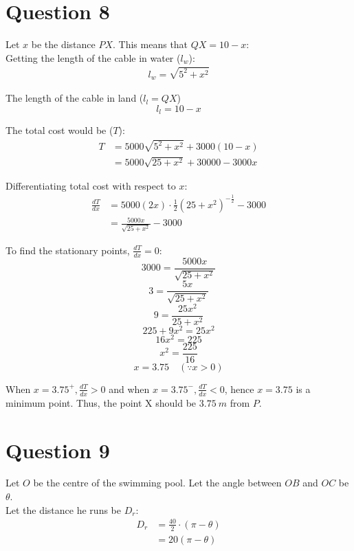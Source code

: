 \documentclass[11pt]{article}
\begin{document}
\section{Question 8}
\label{sec:org3f82fc3}

Let \(x\) be the distance \(PX\). This means that \(QX = 10 - x\):
\\[0pt]

Getting the length of the cable in water (\(l_w\)):
\begin{align*}
l_w = \sqrt{5^2 + x^2}
\end{align*}

The length of the cable in land (\(l_l = QX\))
\[l_l = 10 - x\]

The total cost would be (\(T\)):
\begin{align*}
T &= 5000\sqrt{5^2 + x^2} + 3000(10 - x) \\
&= 5000\sqrt{25 + x^2} + 30000 - 3000x
\end{align*}

Differentiating total cost with respect to \(x\):
\begin{align*}
\frac{dT}{dx} &= 5000(2x) \cdot \frac{1}{2} (25 + x^2)^{-\frac{1}{2}} - 3000 \\
&= \frac{5000x}{\sqrt{25 + x^2}} - 3000
\end{align*}

To find the stationary points, \(\frac{dT}{dx} = 0\):
\[3000 = \frac{5000x}{\sqrt{25 + x^2}}\]
\[3 = \frac{5x}{\sqrt{25 + x^2}}\]
\[9 = \frac{25x^2}{25 + x^2}\]
\[225 + 9x^2 = 25x^2\]
\[16x^2 = 225\]
\[x^2 = \frac{225}{16}\]
\[x = 3.75 \quad (\because x > 0)\]

When \(x = 3.75^+, \frac{dT}{dx} > 0\) and when \(x = 3.75^-, \frac{dT}{dx} < 0\), hence \(x = 3.75\) is a minimum point. Thus, the point X should be \(\qty{3.75}{\unit{m}}\) from \(P\).

\section{Question 9}
\label{sec:org744b777}

Let \(O\) be the centre of the swimming pool. Let the angle between \(OB\) and \(OC\) be \(\theta\).
\\[0pt]

Let the distance he runs be \(D_r\):
\begin{align*}
D_r &= \frac{40}{2} \cdot (\pi - \theta) \\
&= 20(\pi - \theta)
\end{align*}
\end{document}
